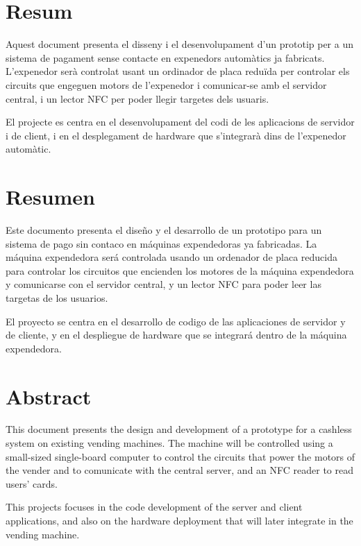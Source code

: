 \section*{Resum}

Aquest document presenta el disseny i el desenvolupament d'un prototip per a un sistema de pagament sense contacte en expenedors automàtics ja fabricats.
L'expenedor serà controlat usant un ordinador de placa reduïda per controlar els circuits que engeguen motors de l'expenedor i comunicar-se amb el servidor central, i un lector NFC per poder llegir targetes dels usuaris. 

El projecte es centra en el desenvolupament del codi de les aplicacions de servidor i de client, i en el desplegament de hardware que s'integrarà dins de l'expenedor automàtic.

\section*{Resumen}

Este documento presenta el diseño y el desarrollo de un prototipo para un sistema de pago sin contaco en máquinas expendedoras ya fabricadas.
La máquina expendedora será controlada usando un ordenador de placa reducida para controlar los circuitos que encienden los motores de la máquina expendedora y comunicarse con el servidor central, y un lector NFC para poder leer las targetas de los usuarios.

El proyecto se centra en el desarrollo de codigo de las aplicaciones de servidor y de cliente, y en el despliegue de hardware que se integrará dentro de la máquina expendedora.

\section*{Abstract}

This document presents the design and development of a prototype for a cashless system on existing vending machines.
The machine will be controlled using a small-sized single-board computer to control the circuits that power the motors of the vender and to comunicate with the central server, and an NFC reader to read users' cards.

This projects focuses in the code development of the server and client applications, and also on the hardware deployment that will later integrate in the vending machine.